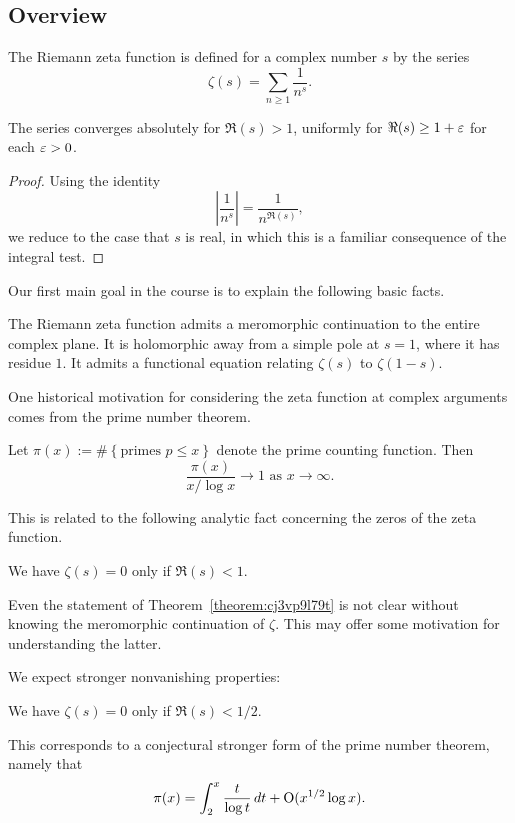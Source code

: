 \documentclass[reqno]{amsart}  \numberwithin{theorem}{section} \numberwithin{equation}{section}
\begin{document}
\subsection{Overview}
The Riemann zeta function is defined for a complex number $s$ by the series
\begin{equation*}
  \zeta (s) = \sum_{n \geq 1} \frac{1}{n^s }.
\end{equation*}
\begin{lemma}
  The series converges absolutely for $\Re(s) > 1$, uniformly for $\Re(s) \geq 1 + \varepsilon$ for each $\varepsilon > 0$.
\end{lemma}
\begin{proof}
  Using the identity
  \begin{equation*}
    \left\lvert \frac{1}{n^s} \right\rvert = \frac{1}{n^{\Re(s)}},
  \end{equation*}
  we reduce to the case that $s$ is real, in which this is a familiar consequence of the integral test.
\end{proof}

Our first main goal in the course is to explain the following basic facts.
\begin{theorem}
  The Riemann zeta function admits a meromorphic continuation to the entire complex plane.  It is holomorphic away from a simple pole at $s = 1$, where it has residue $1$.  It admits a functional equation relating $\zeta (s)$ to $\zeta (1-s)$.
\end{theorem}

One historical motivation for considering the zeta function at complex arguments comes from the prime number theorem.
\begin{theorem}
  Let $\pi(x) := \# \left\{ \text{primes } p \leq x \right\}$ denote the prime counting function.  Then
  \begin{equation*}
    \frac{\pi(x)}{x / \log x} \rightarrow 1
    \text{ as } x \rightarrow \infty.
  \end{equation*}
\end{theorem}
This is related to the following analytic fact concerning the zeros of the zeta function.
\begin{theorem}\label{theorem:cj3vp9l79t}
  We have $\zeta(s) = 0$ only if $\Re(s) < 1$.
\end{theorem}
\begin{remark}
  Even the statement of Theorem~\ref{theorem:cj3vp9l79t} is not clear without knowing the meromorphic continuation of $\zeta$.  This may offer some motivation for understanding the latter.
\end{remark}
We expect stronger nonvanishing properties:
\begin{conjecture}
  We have $\zeta(s) = 0$ only if $\Re(s) < 1/2$.
\end{conjecture}
This corresponds to a conjectural stronger form of the prime number theorem, namely that
\begin{equation*}
  \pi(x) = \int_2^x \frac{t}{\log t} \, d t
  + \operatorname{O} (x^{1/2} \log x).
\end{equation*}




{} 
\end{document}
